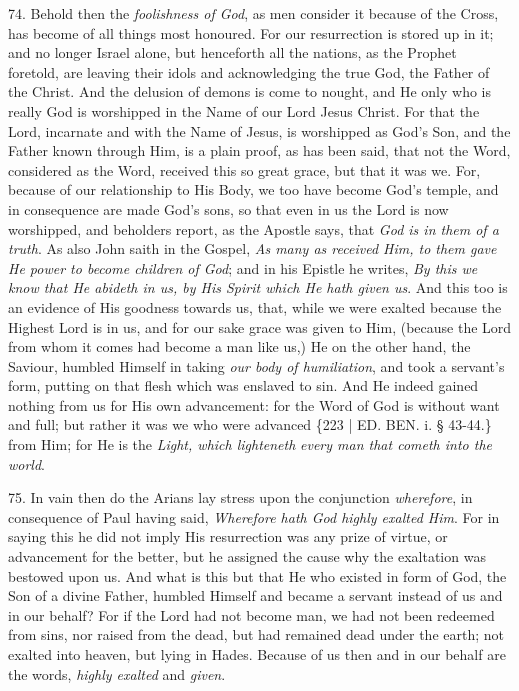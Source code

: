 74. Behold then the \emph{foolishness
of God}, as men consider it because of the Cross, has become of all
things most honoured. For our resurrection is stored up in it; and no
longer Israel alone, but henceforth all the nations, as the Prophet
foretold, are leaving their idols and acknowledging the true God, the
Father of the Christ. And the delusion of demons is come to nought,
and He only who is really God is worshipped in the Name of our Lord
Jesus Christ. For that the Lord, incarnate and with the Name of Jesus,
is worshipped as God's Son, and the Father known through Him, is a
plain proof, as has been said, that not the Word, considered as the
Word, received this so great grace, but that it was we. For, because
of our relationship to His Body, we too have become God's temple, and
in consequence are made God's sons, so that even in us the Lord is now
worshipped, and beholders report, as the Apostle says, that \emph{God is
in them of a truth}. As also John saith in the Gospel, \emph{As many
as received Him, to them gave He power to become children of God};
and in his Epistle he writes, \emph{By this we know that He abideth in
us, by His Spirit which He hath given us}. And this too is an
evidence of His goodness towards us, that, while we were exalted
because the Highest Lord is in us, and for our sake grace was given to
Him, (because the Lord from whom it comes had become a man like us,)
He on the other hand, the Saviour, humbled Himself in taking \emph{our
body of humiliation}, and took a servant's form, putting on that
flesh which was enslaved to sin. And He indeed gained nothing from us
for His own advancement: for the Word of God is without want and full;
but rather it was we who were advanced \{223 | ED.
BEN. i. § 43-44.\} from Him; for He is the \emph{Light,
which lighteneth} \emph{every man that cometh into the world}.

75. In vain then do the Arians
lay stress upon the conjunction \emph{wherefore}, in consequence of
Paul having said, \emph{Wherefore hath God highly exalted Him}. For in
saying this he did not imply His resurrection was any prize of virtue,
or advancement for the better, but he assigned the cause why the
exaltation was bestowed upon us. And what is this but that He who
existed in form of God, the Son of a divine Father, humbled Himself
and became a servant instead of us and in our behalf? For if the Lord
had not become man, we had not been redeemed from sins, nor raised
from the dead, but had remained dead under the earth; not exalted into
heaven, but lying in Hades. Because of us then and in our behalf are
the words, \emph{highly exalted} and \emph{given}.

